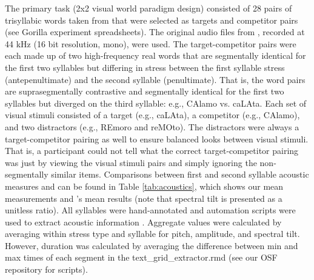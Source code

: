 The primary task (2x2 visual world paradigm design) consisted of 28 pairs of trisyllabic words taken from \cite{Sulpizio_McQueen_2012} that were selected as targets and competitor pairs (see Gorilla experiment spreadsheets). The original audio files from \cite{Sulpizio_McQueen_2012}, recorded at 44 kHz (16 bit resolution, mono), were used. The target-competitor pairs were each made up of two high-frequency real words that are segmentally identical for the first two syllables but differing in stress between the first syllable stress (antepenultimate) and the second syllable (penultimate). That is, the word pairs are suprasegmentally contrastive and segmentally identical for the first two syllables but diverged on the third syllable: e.g., CAlamo vs. caLAta. Each set of visual stimuli consisted of a target (e.g., caLAta), a competitor (e.g., CAlamo), and two distractors (e.g., REmoro and reMOto). The distractors were always a target-competitor pairing as well to ensure balanced looks between visual stimuli. That is, a participant could not tell what the correct target-competitor pairing was just by viewing the visual stimuli pairs and simply ignoring the non-segmentally similar items. Comparisons between first and second syllable acoustic measures and can be found in Table \ref{tab:acoustics}, which shows our mean measurements and \cite{Sulpizio_McQueen_2012}'s mean results (note that spectral tilt is presented as a unitless ratio). All syllables were hand-annotated and automation scripts were used to extract acoustic information \citep{qi_textgrid_maker, dicanio_vowel_acoustics}. Aggregate values were calculated by averaging within stress type and syllable for pitch, amplitude, and spectral tilt. However, duration was calculated by averaging the difference between min and max times of each segment in the text\_grid\_extractor.rmd (see our OSF repository for scripts). 


